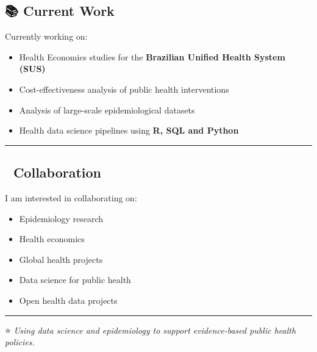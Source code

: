 \documentclass[
]{article}
\providecommand{\tightlist}{%
  \setlength{\itemsep}{0pt}\setlength{\parskip}{0pt}}
\begin{document}
\subsection{📚 Current Work}\label{current-work}

Currently working on:

\begin{itemize}
\tightlist
\item
  Health Economics studies for the \textbf{Brazilian Unified Health
  System (SUS)}
\item
  Cost-effectiveness analysis of public health interventions
\item
  Analysis of large-scale epidemiological datasets
\item
  Health data science pipelines using \textbf{R, SQL and Python}
\end{itemize}

\begin{center}\rule{0.5\linewidth}{0.5pt}\end{center}

\subsection{🤝 Collaboration}\label{collaboration}

I am interested in collaborating on:

\begin{itemize}
\tightlist
\item
  Epidemiology research
\item
  Health economics
\item
  Global health projects
\item
  Data science for public health
\item
  Open health data projects
\end{itemize}

\begin{center}\rule{0.5\linewidth}{0.5pt}\end{center}

⭐ \emph{Using data science and epidemiology to support evidence-based
public health policies.}
\end{document}
